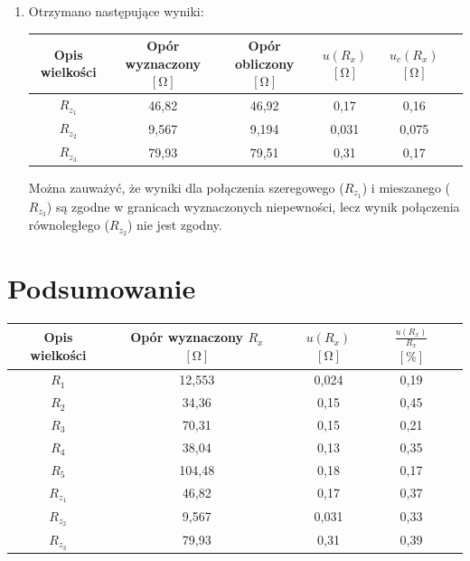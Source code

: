 \documentclass [a4paper,11pt]{article}
\begin{document}
\begin{enumerate}[label=\alph*)]
		\item Otrzymano następujące wyniki:
		\begin{center}
			\begin{tabular}{|c|c|c|c|c|c|}
				\hline Opis wielkości & Opór wyznaczony $[\mathrm{\Omega}]$ & Opór obliczony $[\mathrm{\Omega}]$ & $u(R_x)$ $[\mathrm{\Omega}]$ & $u_c(R_x)$ $[\mathrm{\Omega}]$ \\
				\hline $R_{z_1}$ & 46,82 & 46,92 & 0,17 & 0,16  \\
				\hline $R_{z_2}$ & 9,567 & 9,194 & 0,031 & 0,075  \\  
				\hline $R_{z_3}$ & 79,93 & 79,51  & 0,31 &  0,17 \\ 
				\hline 
			\end{tabular} 
		\end{center}
		Można zauważyć, że wyniki dla połączenia szeregowego ($R_{z_1}$) i mieszanego ($R_{z_3}$) są zgodne w granicach wyznaczonych niepewności, lecz wynik połączenia równoległego ($R_{z_2}$) nie jest zgodny.
	
	\end{enumerate}
	
	\section{Podsumowanie}
	\begin{center}
		\begin{tabular}{|c|c|c|c|c|}
			\hline Opis wielkości & Opór wyznaczony $R_x$ $[\mathrm{\Omega}]$ & $u(R_x)$ $[\mathrm{\Omega}]$ &  $ \frac{u(R_x)}{R_x} $ $[\%]$ \\
			\hline $R_1$ & 12,553 & 0,024 & 0,19  \\
			\hline $R_2$ & 34,36 & 0,15 & 0,45  \\
			\hline $R_3$ & 70,31 & 0,15 & 0,21  \\
			\hline $R_4$ & 38,04 & 0,13 & 0,35  \\
			\hline $R_5$ & 104,48 & 0,18 & 0,17  \\
			\hline $R_{z_1}$ & 46,82 & 0,17 & 0,37  \\
			\hline $R_{z_2}$ & 9,567 & 0,031 & 0,33  \\  
			\hline $R_{z_3}$ & 79,93 & 0,31 & 0,39  \\ 
			\hline 
		\end{tabular} 
	\end{center}
\vspace{1em}
\end{document}
